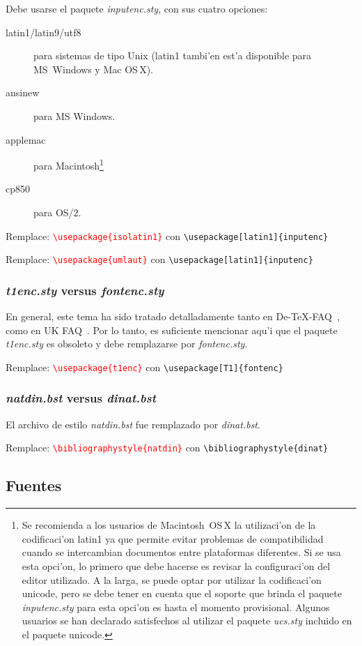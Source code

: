 \documentclass[11pt,a4paper,pagesize,tablecaptionabove,abstracton,pointlessnumbers]{scrartcl}
\newcommand{\gl}{\guillemotleft}
\newcommand{\gr}{\guillemotright}
\newcommand{\TB}{\textbackslash}
\newcommand{\Doku}[1]{\textsf{#1}\xspace}
\newcommand{\Paket}[1]{\textsf{\textsl{#1.sty}}\xspace}
\newcommand{\Bst}[1]{\textsf{\textsl{#1.bst}}\xspace}
\newcommand{\Use}[1]{\texttt{\textbackslash usepackage\{#1\}}}
\newcommand{\UseO}[2]{\texttt{\TB usepackage[#1]\{#2\}}}
\newcommand{\Bib}[1]{\texttt{\textbackslash bibliographystyle\{#1\}}}
\newcommand{\Ersetze}[2]{\par\noindent Remplace: \textcolor{red}{#1}
  con \textcolor{gruen}{#2}}
\begin{document}
Debe usarse el paquete \Paket{inputenc}, con sus cuatro opciones:
\begin{description}
  \item[latin1/latin9/utf8] para sistemas de tipo Unix (latin1 tambi'en est'a disponible para MS~Windows y Mac OS\,X).
  \item[ansinew] para MS Windows.
  \item[applemac] para Macintosh\footnote{Se recomienda a los usuarios de Macintosh~OS\,X la utilizaci'on de la codificaci'on latin1 ya que permite evitar problemas de compatibilidad cuando se intercambian documentos entre plataformas diferentes. Si se usa esta opci'on, lo primero que debe hacerse es revisar la configuraci'on del editor utilizado. A la larga, se puede optar por utilizar la codificaci'on unicode, pero se debe tener en cuenta que el soporte que brinda el paquete \Paket{inputenc} para esta opci'on es hasta el momento provisional. Algunos usuarios se han declarado satisfechos al utilizar el paquete \Paket{ucs} incluido en el paquete \textsf{unicode}.}
  \item[cp850] para OS/2.
\end{description}

\Ersetze{\Use{isolatin1}}{\UseO{latin1}{inputenc}}
\Ersetze{\Use{umlaut}}{\UseO{latin1}{inputenc}}

\subsubsection{\Paket{t1enc} versus \Paket{fontenc}}
\label{sec:schriftkodierung}

En general, este tema ha sido tratado detalladamente tanto en \Doku{De-TeX-FAQ}~\cite[preguntas 5.3.2, 5.3.3, 10.1.10]{faq:02},
como en \Doku{UK FAQ}~\cite[\gl Why use \emph{fontenc} rather than
\emph{t1enc}\gr, pregunta 358]{ukfaq:99}. Por lo tanto, es suficiente mencionar aqu'i que el paquete \Paket{t1enc} es obsoleto y debe remplazarse por \Paket{fontenc}.  

\Ersetze{\Use{t1enc}}{\UseO{T1}{fontenc}}

\subsubsection{\Bst{natdin} versus \Bst{dinat}}
\label{sec:liter-nach-din}

El archivo de estilo \Bst{natdin} fue remplazado por \Bst{dinat}.
\Ersetze{\Bib{natdin}}{\Bib{dinat}}

\subsection{Fuentes}
\label{sec:schriften}
\end{document}
